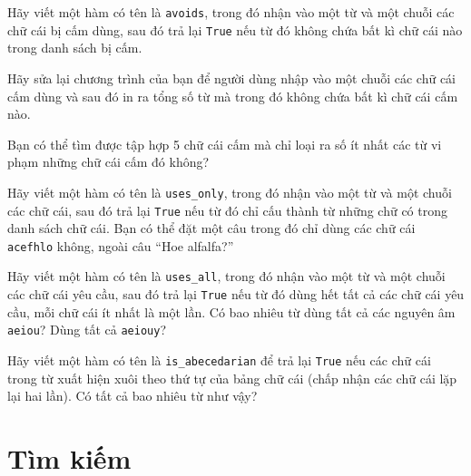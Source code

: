 \documentclass[11pt]{book}
\begin{document}
\begin{ex} 
Hãy viết một hàm có tên là {\tt avoids}, trong đó nhận vào một từ và một chuỗi các
chữ cái bị cấm dùng, sau đó trả lại {\tt True} nếu từ đó không chứa bất kì
chữ cái nào trong danh sách bị cấm.

Hãy sửa lại chương trình của bạn để người dùng nhập vào một chuỗi các
chữ cái cấm dùng và sau đó in ra tổng số từ mà trong đó không chứa bất kì
chữ cái cấm nào.

Bạn có thể tìm được tập hợp 5 chữ cái cấm mà chỉ loại ra số ít nhất các từ
vi phạm những chữ cái cấm đó không?
\end{ex}

\begin{ex}
Hãy viết một hàm có tên là \verb"uses_only", trong đó nhận vào một từ và một
chuỗi các chữ cái, sau đó trả lại {\tt True} nếu từ đó chỉ cấu thành
từ những chữ có trong danh sách chữ cái. Bạn có thể đặt một câu trong
đó chỉ dùng các chữ cái {\tt acefhlo} không, ngoài câu ``Hoe alfalfa?''
\end{ex}


\begin{ex} 
Hãy viết một hàm có tên là \verb"uses_all", trong đó nhận vào một từ
và một chuỗi các chữ cái yêu cầu, sau đó trả lại {\tt True} nếu từ đó
dùng hết tất cả các chữ cái yêu cầu, mỗi chữ cái ít nhất là một lần.
Có bao nhiêu từ dùng tất cả các nguyên âm {\tt aeiou}? Dùng tất cả {\tt aeiouy}?
\end{ex}


\begin{ex}
Hãy viết một hàm có tên là \verb"is_abecedarian" để trả lại
{\tt True} nếu các chữ cái trong từ xuất hiện xuôi theo thứ tự của bảng
chữ cái (chấp nhận các chữ cái lặp lại hai lần). Có tất cả bao nhiêu từ
như vậy?
\end{ex}







\section{Tìm kiếm}
\end{document}
